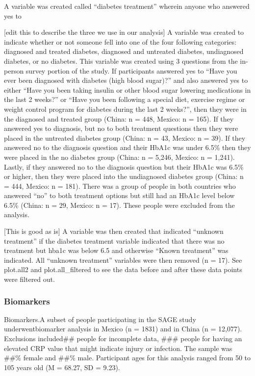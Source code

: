 \documentclass[
  man]{apa6}
\begin{document}
A variable was created called ``diabetes treatment'' wherein anyone who answered yes to

{[}edit this to describe the three we use in our analysis{]}
A variable was created to indicate whether or not someone fell into one of the four following categories: diagnosed and treated diabetes, diagnosed and untreated diabetes, undiagnosed diabetes, or no diabetes. This variable was created using 3 questions from the in-person survey portion of the study. If participants answered yes to ``Have you ever been diagnosed with diabetes (high blood sugar)?'' and also answered yes to either ``Have you been taking insulin or other blood sugar lowering medications in the last 2 weeks?'' or ``Have you been following a special diet, exercise regime or weight control program for diabetes during the last 2 weeks?'', then they were in the diagnosed and treated group (China: n = 448, Mexico: n = 165). If they answered yes to diagnosis, but no to both treatment questions then they were placed in the untreated diabetes group (China: n = 43, Mexico: n = 39). If they answered no to the diagnosis question and their HbA1c was under 6.5\% then they were placed in the no diabetes group (China: n = 5,246, Mexico: n = 1,241). Lastly, if they answered no to the diagnosis question but their HbA1c was 6.5\% or higher, then they were placed into the undiagnosed diabetes group (China: n = 444, Mexico: n = 181). There was a group of people in both countries who answered ``no'' to both treatment options but still had an HbA1c level below 6.5\% (China: n = 29, Mexico: n = 17). These people were excluded from the analysis.

{[}This is good as is{]}
A variable was then created that indicated ``unknown treatment'' if the diabetes treatment variable indicated that there was no treatment but hba1c was below 6.5 and otherwise ``Known treatment'' was indicated. All ``unknown treatment'' variables were then removed (n = 17). See plot.all2 and plot.all\_filtered to see the data before and after these data points were filtered out.

\hypertarget{biomarkers}{%
\subsubsection{Biomarkers}\label{biomarkers}}

Biomarkers.A subset of people participating in the SAGE study underwentbiomarker analysis in Mexico (n = 1831) and in China (n = 12,077). Exclusions included\#\# people for incomplete data, \#\#\# people for having an elevated CRP value that might indicate injury or infection. The sample was \#\#\% female and \#\#\% male. Participant ages for this analysis ranged from 50 to 105 years old (M = 68.27, SD = 9.23).
\end{document}
